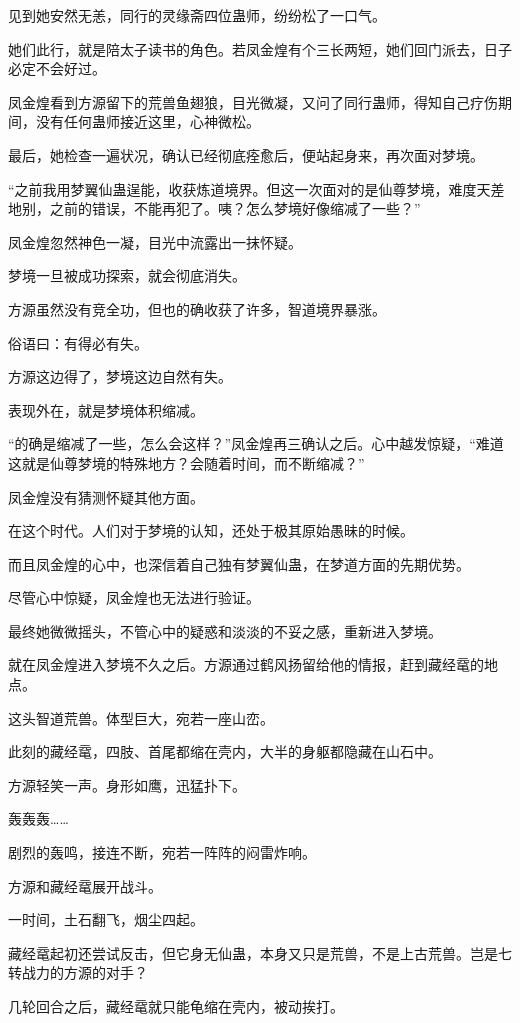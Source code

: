 \begin{this_body}
见到她安然无恙，同行的灵缘斋四位蛊师，纷纷松了一口气。

她们此行，就是陪太子读书的角色。若凤金煌有个三长两短，她们回门派去，日子必定不会好过。

凤金煌看到方源留下的荒兽鱼翅狼，目光微凝，又问了同行蛊师，得知自己疗伤期间，没有任何蛊师接近这里，心神微松。

最后，她检查一遍状况，确认已经彻底痊愈后，便站起身来，再次面对梦境。

“之前我用梦翼仙蛊逞能，收获炼道境界。但这一次面对的是仙尊梦境，难度天差地别，之前的错误，不能再犯了。咦？怎么梦境好像缩减了一些？”

凤金煌忽然神色一凝，目光中流露出一抹怀疑。

梦境一旦被成功探索，就会彻底消失。

方源虽然没有竞全功，但也的确收获了许多，智道境界暴涨。

俗语曰：有得必有失。

方源这边得了，梦境这边自然有失。

表现外在，就是梦境体积缩减。

“的确是缩减了一些，怎么会这样？”凤金煌再三确认之后。心中越发惊疑，“难道这就是仙尊梦境的特殊地方？会随着时间，而不断缩减？”

凤金煌没有猜测怀疑其他方面。

在这个时代。人们对于梦境的认知，还处于极其原始愚昧的时候。

而且凤金煌的心中，也深信着自己独有梦翼仙蛊，在梦道方面的先期优势。

尽管心中惊疑，凤金煌也无法进行验证。

最终她微微摇头，不管心中的疑惑和淡淡的不妥之感，重新进入梦境。

就在凤金煌进入梦境不久之后。方源通过鹤风扬留给他的情报，赶到藏经鼋的地点。

这头智道荒兽。体型巨大，宛若一座山峦。

此刻的藏经鼋，四肢、首尾都缩在壳内，大半的身躯都隐藏在山石中。

方源轻笑一声。身形如鹰，迅猛扑下。

轰轰轰……

剧烈的轰鸣，接连不断，宛若一阵阵的闷雷炸响。

方源和藏经鼋展开战斗。

一时间，土石翻飞，烟尘四起。

藏经鼋起初还尝试反击，但它身无仙蛊，本身又只是荒兽，不是上古荒兽。岂是七转战力的方源的对手？

几轮回合之后，藏经鼋就只能龟缩在壳内，被动挨打。


\end{this_body}
